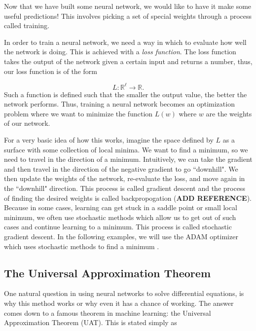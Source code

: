\documentclass{CUP-JNL-DTM}%
\theoremstyle{definition}
\numberwithin{equation}{section}
\begin{document}
Now that we have built some neural network, we would like to have it make some useful predictions! This involves picking a set of special weights through a process called training. 

In order to train a neural network, we need a way in which to evaluate how well the network is doing. This is achieved with a \emph{loss function}. The loss function takes the output of the network given a certain input and returns a number, thus, our loss function is of the form

\begin{equation}
    L : \mathbb{R}^{\ell} \rightarrow \mathbb{R}. 
\end{equation}
Such a function is defined such that the smaller the output value, the better the network performs. Thus, training a neural network becomes an optimization problem where we want to minimize the function $L(w)$ where $w$ are the weights of our network. 

For a very basic idea of how this works, imagine the space defined by $L$ as a surface with some collection of local minima. We want to find a minimum, so we need to travel in the direction of a minimum. Intuitively, we can take the gradient and then travel in the direction of the negative gradient to go ``downhill". We then update the weights of the network, re-evaluate the loss, and move again in the ``downhill" direction. This process is called gradient descent and the process of finding the desired weights is called backpropogation (\textbf{ADD REFERENCE}). Because in some cases, learning can get stuck in a saddle point or small local minimum, we often use stochastic methods which allow us to get out of such cases and continue learning to a minimum. This process is called stochastic gradient descent. In the following examples, we will use the ADAM optimizer which uses stochastic methods to find a minimum \cite{kingmaAdamMethodStochastic2017}. 


\subsection{The Universal Approximation Theorem}

One natural question in using neural networks to solve differential equations, is why this method works or why even it has a chance of working. The answer comes down to a famous theorem in machine learning: the Universal Approximation Theorem (UAT). This is stated simply as 
\end{document}
